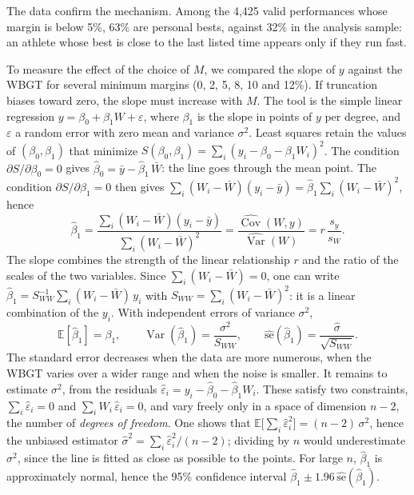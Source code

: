 \documentclass[11pt,a4paper]{article}
\newcommand{\E}{\mathbb{E}}
\DeclareMathOperator{\Var}{Var}
\DeclareMathOperator{\Cov}{Cov}
\begin{document}
The data confirm the mechanism. Among the 4,425 valid performances whose margin is below 5\%, 63\% are personal bests,
against 32\% in the analysis sample: an athlete whose best is close to the last listed time appears only if they run
fast.

To measure the effect of the choice of $M$, we compared the slope of $y$ against the WBGT for several minimum margins
(0, 2, 5, 8, 10 and 12\%). If truncation biases toward zero, the slope must increase with $M$. The tool is the simple
linear regression $y = \beta_0 + \beta_1 W + \varepsilon$, where $\beta_1$ is the slope in points of $y$ per degree,
and $\varepsilon$ a random error with zero mean and variance $\sigma^2$. Least squares retain the values of
$(\beta_0, \beta_1)$ that minimize $S(\beta_0, \beta_1) = \sum_i (y_i - \beta_0 - \beta_1 W_i)^2$. The condition
$\partial S/\partial \beta_0 = 0$ gives $\hat\beta_0 = \bar y - \hat\beta_1\,\bar W$: the line goes through the mean
point. The condition $\partial S/\partial \beta_1 = 0$ then gives
$\sum_i (W_i - \bar W)(y_i - \bar y) = \hat\beta_1\sum_i (W_i - \bar W)^2$, hence
\[
\hat\beta_1 = \frac{\sum_i (W_i - \bar W)(y_i - \bar y)}{\sum_i (W_i - \bar W)^2}
= \frac{\widehat{\Cov}(W, y)}{\widehat{\Var}(W)} = r\,\frac{s_y}{s_W} .
\]
The slope combines the strength of the linear relationship $r$ and the ratio of the scales of the two variables.
Since $\sum_i (W_i - \bar W) = 0$, one can write $\hat\beta_1 = S_{WW}^{-1}\sum_i (W_i - \bar W)\,y_i$ with
$S_{WW} = \sum_i (W_i - \bar W)^2$: it is a linear combination of the $y_i$. With independent errors of variance
$\sigma^2$,
\[
\E[\hat\beta_1] = \beta_1, \qquad \Var(\hat\beta_1) = \frac{\sigma^2}{S_{WW}}, \qquad
\widehat{\mathrm{se}}(\hat\beta_1) = \frac{\hat\sigma}{\sqrt{S_{WW}}} .
\]
The standard error decreases when the data are more numerous, when the WBGT varies over a wider range and when the
noise is smaller. It remains to estimate $\sigma^2$, from the residuals $\hat\varepsilon_i = y_i - \hat\beta_0 -
\hat\beta_1 W_i$. These satisfy two constraints, $\sum_i \hat\varepsilon_i = 0$ and
$\sum_i W_i\,\hat\varepsilon_i = 0$, and vary freely only in a space of dimension $n - 2$, the number of \emph{degrees
of freedom}. One shows that $\E\big[\sum_i \hat\varepsilon_i^2\big] = (n - 2)\,\sigma^2$, hence the unbiased estimator
$\hat\sigma^2 = \sum_i \hat\varepsilon_i^2/(n - 2)$; dividing by $n$ would underestimate $\sigma^2$, since the line is
fitted as close as possible to the points. For large $n$, $\hat\beta_1$ is approximately normal, hence the 95\%
confidence interval $\hat\beta_1 \pm 1.96\,\widehat{\mathrm{se}}(\hat\beta_1)$.
\end{document}
